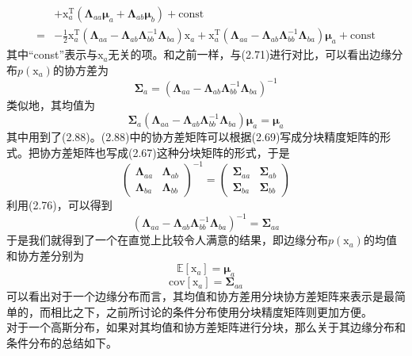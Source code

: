 \documentclass[b5paper]{book}
\numberwithin{equation}{chapter}
\newcommand {\bx} {\boldsymbol{\mathrm{x}}}
\newcommand {\rmT} {\mathrm{T}}
\newcommand {\bfMu} {\boldsymbol{\mu}}
\newcommand {\bfSigma} {\boldsymbol{\Sigma}}
\newcommand {\bfLambda} {\boldsymbol{\Lambda}}
\begin{document}
{\begin{equation}
\begin{split}
		&+\bx_a^{\rmT}(\bfLambda_{aa}\bfMu_a+\bfLambda_{ab}\bfMu_b)+\mathrm{const} \\
		= &-\frac{1}{2}\bx_a^{\rmT}(\bfLambda_{aa}-\bfLambda_{ab}\bfLambda_{bb}^{-1}\bfLambda_{ba})\bx_a+\bx_a^{\rmT}(\bfLambda_{aa}-\bfLambda_{ab}\bfLambda_{bb}^{-1}\bfLambda_{ba})\bfMu_a + \mathrm{const}
	\end{split}
	\end{equation}
	其中“const”表示与$\bx_a$无关的项。和之前一样，与(2.71)进行对比，可以看出边缘分布$p(\bx_a)$的协方差为
	\begin{equation}
		\bfSigma_a=(\bfLambda_{aa}-\bfLambda_{ab}\bfLambda_{bb}^{-1}\bfLambda_{ba})^{-1}
	\end{equation}
	类似地，其均值为
	\begin{equation}
		\bfSigma_a(\bfLambda_{aa}-\bfLambda_{ab}\bfLambda_{bb}^{-1}\bfLambda_{ba})\bfMu_a = \bfMu_a
	\end{equation}
	其中用到了(2.88)。(2.88)中的协方差矩阵可以根据(2.69)写成分块精度矩阵的形式。把协方差矩阵也写成(2.67)这种分块矩阵的形式，于是
	\begin{equation}
		\left(\begin{matrix}
			\bfLambda_{aa} & \bfLambda_{ab} \\
			\bfLambda_{ba} & \bfLambda_{bb}
		\end{matrix}\right)^{-1} = \left(\begin{matrix}
			\bfSigma_{aa} & \bfSigma_{ab} \\
			\bfSigma_{ba} & \bfSigma_{bb}
		\end{matrix}\right)
	\end{equation}
	利用(2.76)，可以得到
	\begin{equation}
		(\bfLambda_{aa}-\bfLambda_{ab}\bfLambda_{bb}^{-1}\bfLambda_{ba})^{-1}=\bfSigma_{aa}
	\end{equation}
	于是我们就得到了一个在直觉上比较令人满意的结果，即边缘分布$p(\bx_a)$的均值和协方差分别为
	\begin{equation}
		\mathbb{E}[\bx_a]=\bfMu_a
	\end{equation}
	\begin{equation}
		\mathrm{cov}[\bx_a]=\bfSigma_{aa}
	\end{equation}
	可以看出对于一个边缘分布而言，其均值和协方差用分块协方差矩阵来表示是最简单的，而相比之下，之前所讨论的条件分布使用分块精度矩阵则更加方便。\\
	\indent 对于一个高斯分布，如果对其均值和协方差矩阵进行分块，那么关于其边缘分布和条件分布的总结如下。\\
}
\end{document}
